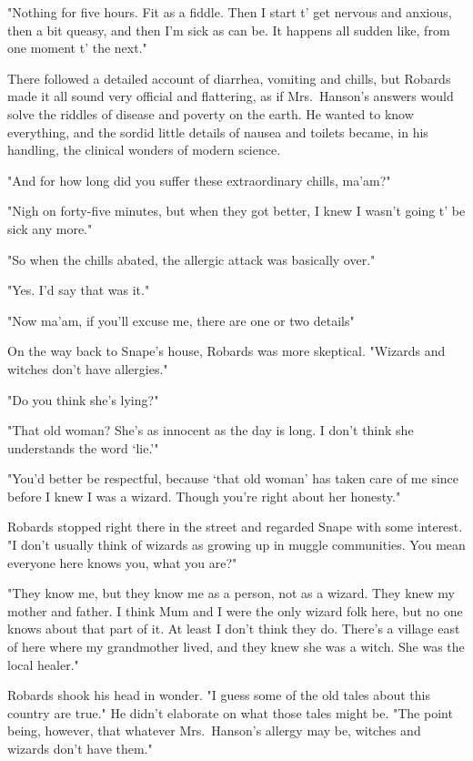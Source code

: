 "Nothing for five hours. Fit as a fiddle. Then I start t' get nervous and anxious, then a bit queasy, and then I'm sick as can be. It happens all sudden like, from one moment t' the next."

There followed a detailed account of diarrhea, vomiting and chills, but Robards made it all sound very official and flattering, as if Mrs.~Hanson's answers would solve the riddles of disease and poverty on the earth. He wanted to know everything, and the sordid little details of nausea and toilets became, in his handling, the clinical wonders of modern science.

"And for how long did you suffer these extraordinary chills, ma'am?"

"Nigh on forty-five minutes, but when they got better, I knew I wasn't going t' be sick any more."

"So when the chills abated, the allergic attack was basically over."

"Yes. I'd say that was it."

"Now ma'am, if you'll excuse me, there are one or two details{\el}"

On the way back to Snape's house, Robards was more skeptical. "Wizards and witches don't have allergies."

"Do you think she's lying?"

"That old woman? She's as innocent as the day is long. I don't think she understands the word `lie.'"

"You'd better be respectful, because `that old woman' has taken care of me since before I knew I was a wizard. Though you're right about her honesty."

Robards stopped right there in the street and regarded Snape with some interest. "I don't usually think of wizards as growing up in muggle communities. You mean everyone here knows you, what you are?"

"They know me, but they know me as a person, not as a wizard. They knew my mother and father. I think Mum and I were the only wizard folk here, but no one knows about that part of it. At least I don't think they do. There's a village east of here where my grandmother lived, and they knew she was a witch. She was the local healer."

Robards shook his head in wonder. "I guess some of the old tales about this country are true." He didn't elaborate on what those tales might be. "The point being, however, that whatever Mrs.~Hanson's allergy may be, witches and wizards don't have them."

